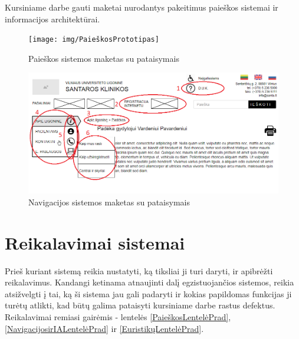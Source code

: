 \documentclass{VUMIFPSkursinis}
\begin{document}
Kursiniame darbe gauti maketai nurodantys pakeitimus paieškos sistemai ir informacijos architektūrai.

\begin{figure}[H]
    \centering
    \texttt{[image: img/PaieškosPrototipas]}
    \caption{Paieškos sistemos maketas su pataisymais}
    \label{img:PaieškosPrototipas}
\end{figure}

\begin{figure}[H]
    \centering
    \includegraphics[scale=0.65]{img/NavigacijosPrototipas}
    \caption{Navigacijos sistemos maketas su pataisymais}
    \label{img:NavigacijosPrototipas}
\end{figure}

\section{Reikalavimai sistemai}
Prieš kuriant sistemą reikia nustatyti, ką tiksliai ji turi daryti, ir apibrėžti reikalavimus. Kandangi ketinama atnaujinti dalį egzistuojančios sistemos, reikia atsižvelgti į tai, ką ši sistema jau gali padaryti ir kokias papildomas funkcijas ji turėtų atlikti, kad būtų galima pataisyti kursiniame darbe rastus defektus\cite{Kursinis}. Reikalavimai remiasi gairėmis - lentelės \ref{PaieškosLentelėPrad}, \ref{NavigacijosirIALentelėPrad} ir \ref{EuristikųLentelėPrad}.
\end{document}
